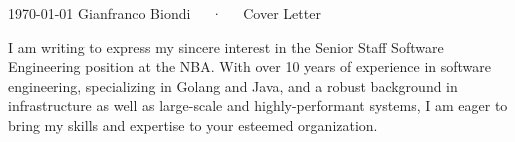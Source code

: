 \documentclass[11pt, a4paper]{awesome-cv}
\begin{document}
\makecvheader[R]

\makecvfooter
{\today}
{Gianfranco Biondi~~~·~~~Cover Letter}
{}

\makelettertitle

\begin{cvletter}

  I am writing to express my sincere interest in the Senior Staff Software Engineering position at the NBA. With over 10 years of experience in software engineering, specializing in Golang and Java, and a robust background in infrastructure as well as large-scale and highly-performant systems, I am eager to bring my skills and expertise to your esteemed organization.






\end{cvletter}
\end{document}
